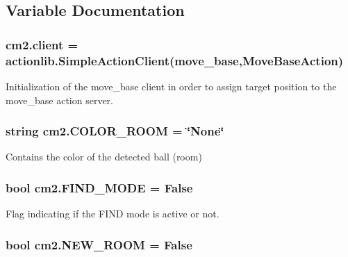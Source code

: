 \subsection{Variable Documentation}
\subsubsection[{\texorpdfstring{client}{client}}]{\setlength{\rightskip}{0pt plus 5cm}cm2.\+client = actionlib.\+Simple\+Action\+Client(\textquotesingle{}move\+\_\+base\textquotesingle{},Move\+Base\+Action)}\hypertarget{namespacecm2_a28fc643331943609822bc8a7b964ba75}{}\label{namespacecm2_a28fc643331943609822bc8a7b964ba75}


Initialization of the move\+\_\+base client in order to assign target position to the move\+\_\+base action server. 

\subsubsection[{\texorpdfstring{C\+O\+L\+O\+R\+\_\+\+R\+O\+OM}{COLOR_ROOM}}]{\setlength{\rightskip}{0pt plus 5cm}string cm2.\+C\+O\+L\+O\+R\+\_\+\+R\+O\+OM = \char`\"{}None\char`\"{}}\hypertarget{namespacecm2_ae260b3b72cff4373b17d7804c4445605}{}\label{namespacecm2_ae260b3b72cff4373b17d7804c4445605}


Contains the color of the detected ball (room) 

\subsubsection[{\texorpdfstring{F\+I\+N\+D\+\_\+\+M\+O\+DE}{FIND_MODE}}]{\setlength{\rightskip}{0pt plus 5cm}bool cm2.\+F\+I\+N\+D\+\_\+\+M\+O\+DE = False}\hypertarget{namespacecm2_a09c3979998f6574c8221fc68a7c1c528}{}\label{namespacecm2_a09c3979998f6574c8221fc68a7c1c528}


Flag indicating if the F\+I\+ND mode is active or not. 

\subsubsection[{\texorpdfstring{N\+E\+W\+\_\+\+R\+O\+OM}{NEW_ROOM}}]{\setlength{\rightskip}{0pt plus 5cm}bool cm2.\+N\+E\+W\+\_\+\+R\+O\+OM = False}\hypertarget{namespacecm2_afc7e28693040c02b9b903acdc4ef9676}{}\label{namespacecm2_afc7e28693040c02b9b903acdc4ef9676}


